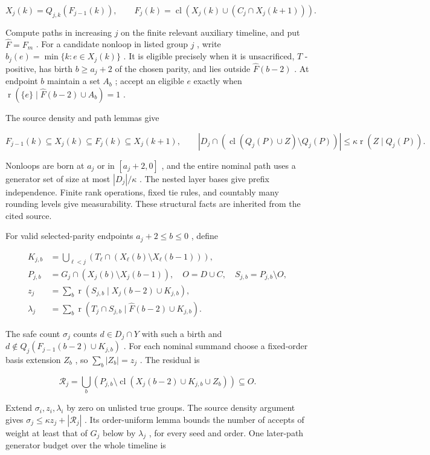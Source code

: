 \documentclass[11pt]{article}
\begin{document}
\[X_j(k)=Q_{j,k}(F_{j-1}(k)),\qquad
 F_j(k)=\operatorname{cl}(X_j(k)\cup(C_j\cap X_j(k+1))).\]

Compute paths in increasing \(j\) on the finite relevant auxiliary timeline, and put \(\widehat F=F_m\) . For a candidate nonloop in listed group \(j\) , write \(b_j(e)=\min\{k:e\in X_j(k)\}\) . It is eligible precisely when it is unsacrificed, \(T\) -positive, has birth \(b\ge a_j+2\) of the chosen parity, and lies outside \(\widehat F(b-2)\) . At endpoint \(b\) maintain a set \(A_b\) ; accept an eligible \(e\) exactly when \(\operatorname{r}(\{e\}\mid\widehat F(b-2)\cup A_b)=1\) .

The source density and path lemmas give

\[F_{j-1}(k)\subseteq X_j(k)\subseteq F_j(k)\subseteq X_j(k+1),\qquad
 |D_j\cap(\operatorname{cl}(Q_j(P)\cup Z)\setminus Q_j(P))|\le\kappa\operatorname{r}(Z\mid Q_j(P)).\]

Nonloops are born at \(a_j\) or in \([a_j+2,0]\) , and the entire nominal path uses a generator set of size at most \(|D_j|/\kappa\) . The nested layer bases give prefix independence. Finite rank operations, fixed tie rules, and countably many rounding levels give measurability. These structural facts are inherited from the cited source.

For valid selected-parity endpoints \(a_j+2\le b\le0\) , define

\[\begin{aligned}
 K_{j,b}&=\bigcup_{\ell<j}(T_\ell\cap(X_\ell(b)\setminus X_\ell(b-1))),\\
 P_{j,b}&=G_j\cap(X_j(b)\setminus X_j(b-1)),\quad
 O=D\cup C,\quad S_{j,b}=P_{j,b}\setminus O,\\
 z_j&=\sum_b\operatorname{r}(S_{j,b}\mid X_j(b-2)\cup K_{j,b}),\\
 \lambda_j&=\sum_b\operatorname{r}(T_j\cap S_{j,b}\mid\widehat F(b-2)\cup K_{j,b}).
 \end{aligned}\]

The safe count \(\sigma_j\) counts \(d\in D_j\cap Y\) with such a birth and \(d\notin Q_j(F_{j-1}(b-2)\cup K_{j,b})\) . For each nominal summand choose a fixed-order basis extension \(Z_b\) , so \(\sum_b|Z_b|=z_j\) . The residual is

\[\mathcal R_j=\bigcup_b\left(P_{j,b}\setminus
 \operatorname{cl}(X_j(b-2)\cup K_{j,b}\cup Z_b)\right)\subseteq O.\]

Extend \(\sigma_i,z_i,\lambda_i\) by zero on unlisted true groups. The source density argument gives \(\sigma_j\le\kappa z_j+|\mathcal R_j|\) . Its order-uniform lemma bounds the number of accepts of weight at least that of \(G_j\) below by \(\lambda_j\) , for every seed and order. One later-path generator budget over the whole timeline is
\end{document}
